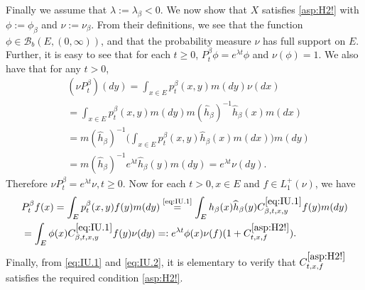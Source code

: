 \documentclass[12pt,a4paper]{amsart}
\numberwithin{equation}{section}
\theoremstyle{plain}
\theoremstyle{definition}
\theoremstyle{remark}
\begin{document}
	Finally we assume that $\lambda := \lambda_\beta < 0$. We now show that $X$ satisfies \eqref{asp:H2!} with $\phi:=\phi_\beta$ and $\nu:= \nu_\beta$.
	From their definitions, we see that the function $\phi \in \mathcal B_b(E,(0,\infty))$, and that the probability measure $\nu$ has full support on $E$.
	Further, it is easy to see that for each $t\geq 0$, $P_t^\beta \phi = e^{\lambda t}\phi$ and $\nu(\phi) = 1$.
	We also have that for any $t>0$,
\begin{align}
	&(\nu P_t^\beta)(dy) = \int_{x\in E}p_{t}^\beta(x,y)m(dy) \nu(dx)
	\\&= \int_{x\in E}p_{t}^\beta(x,y)m(dy) m(\widehat h_\beta)^{-1}\widehat h_\beta(x)m(dx)
	\\&=  m(\widehat h_\beta)^{-1}  \Big(\int_{x\in E} p_t^\beta(x,y) \widehat h_\beta(x) m(dx) \Big) m(dy)
	\\& = m(\widehat h_\beta)^{-1} e^{\lambda t}\widehat h_\beta(y) m(dy) =
	e^{\lambda t}\nu(dy).
\end{align}
	Therefore $\nu P_t^\beta = e^{\lambda t}\nu, t\geq 0$. Now for each $t>0, x \in E$ and $f\in L_1^+(\nu)$, we have
\begin{align}
	&P_t^\beta f(x) = \int_{E} p^\beta_t(x,y) f(y)m(dy)
	\overset{\text{\eqref{eq:IU.1}}}= \int_{E} h_\beta (x) \widehat h_\beta (y) C^{\eqref{eq:IU.1}}_{\beta,t,x,y} f(y) m(dy)
	\\&= \int_{E} \phi (x)  C^{\eqref{eq:IU.1}}_{\beta,t,x,y} f(y) \nu(dy)
	=: e^{\lambda t} \phi(x) \nu(f) (1+ C^{\eqref{asp:H2!}}_{t,x,f}).
\end{align}
	Finally, from \eqref{eq:IU.1} and \eqref{eq:IU.2}, it is elementary to verify that $C^{\eqref{asp:H2!}}_{t,x,f}$ satisfies the required condition \eqref{asp:H2!}.
\end{document}
